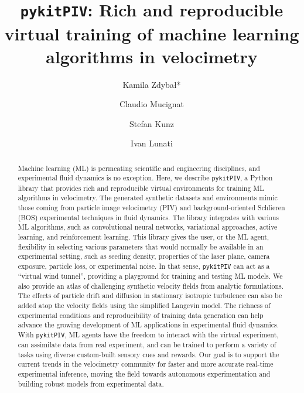 \documentclass[a4paper,fleqn]{cas-dc}
\begin{document}

\title [mode = title]{\texttt{pykitPIV}: Rich and reproducible virtual training of machine learning algorithms in velocimetry}

\author[EMPA]{Kamila Zdyba\l{}*}

\author[EMPA]{Claudio Mucignat}
\author[EMPA]{Stefan Kunz}
\author[EMPA]{Ivan Lunati}

\address[EMPA]{Laboratory for Computational Engineering, Swiss Federal Laboratories for Materials Science and Technology, Empa, Dübendorf, Switzerland}

\begin{abstract}
Machine learning (ML) is permeating scientific and engineering disciplines, and experimental fluid dynamics is no exception. Here, we describe \texttt{pykitPIV}, a Python library that provides rich and reproducible virtual environments for training ML algorithms in velocimetry. The generated synthetic datasets and environments mimic those coming from particle image velocimetry (PIV) and background-oriented Schlieren (BOS) experimental techniques in fluid dynamics. The library integrates with various ML algorithms, such as convolutional neural networks, variational approaches, active learning, and reinforcement learning. This library gives the user, or the ML agent, flexibility in selecting various parameters that would normally be available in an experimental setting, such as seeding density, properties of the laser plane, camera exposure, particle loss, or experimental noise. In that sense, \texttt{pykitPIV} can act as a ``virtual wind tunnel'', providing a playground for training and testing ML models. We also provide an atlas of challenging synthetic velocity fields from analytic formulations. The effects of particle drift and diffusion in stationary isotropic turbulence can also be added atop the velocity fields using the simplified Langevin model. The richness of experimental conditions and reproducibility of training data generation can help advance the growing development of ML applications in experimental fluid dynamics. With \texttt{pykitPIV}, ML agents have the freedom to interact with the virtual experiment, can assimilate data from real experiment, and can be trained to perform a variety of tasks using diverse custom-built sensory cues and rewards. Our goal is to support the current trends in the velocimetry community for faster and more accurate real-time experimental inference, moving the field towards autonomous experimentation and building robust models from experimental data.
\end{abstract}
\end{document}
